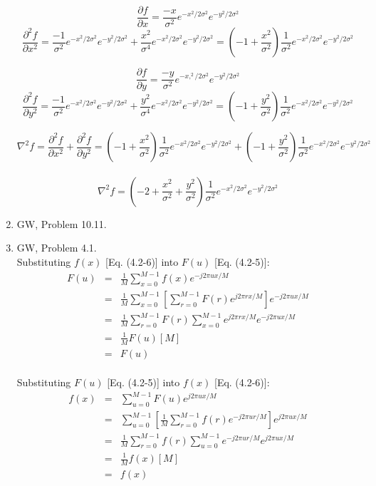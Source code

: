 \documentclass[10pt,letterpaper,oneside,onecolumn,leqno,fleqn]{article}
\begin{document}
\begin{enumerate}
      $$ \frac{\partial f}{\partial x} = \frac{-x}{\sigma^2}
      e^{-x^2/2\sigma^2}e^{-y^2/2\sigma^2} $$
      $$ \frac{\partial^2 f}{\partial x^2} = \frac{-1}{\sigma^2}
      e^{-x^2/2\sigma^2}e^{-y^2/2\sigma^2} + \frac{x^2}{\sigma^4} 
      e^{-x^2/2\sigma^2}e^{-y^2/2\sigma^2} =
      \left(-1 + \frac{x^2}{\sigma^2} \right)
      \frac{1}{\sigma^2}e^{-x^2/2\sigma^2}e^{-y^2/2\sigma^2} $$

      $$ \frac{\partial f}{\partial y} = \frac{-y}{\sigma^2}
      e^{-x,^2/2\sigma^2}e^{-y^2/2\sigma^2} $$
      $$ \frac{\partial^2 f}{\partial y^2} = \frac{-1}{\sigma^2}
      e^{-x^2/2\sigma^2}e^{-y^2/2\sigma^2} + \frac{y^2}{\sigma^4} 
      e^{-x^2/2\sigma^2}e^{-y^2/2\sigma^2}  =
      \left(-1 + \frac{y^2}{\sigma^2} \right)
      \frac{1}{\sigma^2}e^{-x^2/2\sigma^2}e^{-y^2/2\sigma^2} $$

      $$ \nabla^2f = \frac{\partial^2 f}{\partial x^2} +
      \frac{\partial^2 f}{\partial y^2} =
      \left(-1 + \frac{x^2}{\sigma^2} \right)
      \frac{1}{\sigma^2}e^{-x^2/2\sigma^2}e^{-y^2/2\sigma^2} +
      \left(-1 + \frac{y^2}{\sigma^2} \right)
      \frac{1}{\sigma^2}e^{-x^2/2\sigma^2}e^{-y^2/2\sigma^2} $$ \\
      $$ \nabla^2f =
      \left(-2 + \frac{x^2}{\sigma^2} + \frac{y^2}{\sigma^2} \right)
      \frac{1}{\sigma^2}e^{-x^2/2\sigma^2}e^{-y^2/2\sigma^2} $$

    \pagebreak
    \item
      GW, Problem 10.11.

    \pagebreak
    \item
      GW, Problem 4.1. \\
      \linebreak
      Substituting $ f(x) $ [Eq. (4.2-6)] into $ F(u) $ [Eq. (4.2-5)]:
      \begin{eqnarray*}
        F(u) &=& \frac{1}{M}\sum_{x=0}^{M-1} f(x)e^{-j2\pi ux/M} \\
             &=& \frac{1}{M}\sum_{x=0}^{M-1}\left[ \sum_{r=0}^{M-1} 
                 F(r) e^{j2\pi rx/M} \right] e^{-j2\pi ux/M} \\
             &=& \frac{1}{M}\sum_{r=0}^{M-1} F(r) \sum_{x=0}^{M-1} 
                 e^{j2\pi rx/M} e^{-j2\pi ux/M} \\
             &=& \frac{1}{M}F(u)[M] \\
             &=& F(u)
      \end{eqnarray*} \\
      \linebreak
      Substituting $ F(u) $ [Eq. (4.2-5)] into $ f(x) $ [Eq. (4.2-6)]:
      \begin{eqnarray*}
        f(x) &=& \sum_{u=0}^{M-1} F(u)e^{j2\pi ux/M} \\
             &=& \sum_{u=0}^{M-1} \left[ \frac{1}{M}\sum_{r=0}^{M-1}
                 f(r)e^{-j2\pi ur/M} \right] e^{j2\pi ux/M} \\
             &=& \frac{1}{M}\sum_{r=0}^{M-1} f(r) \sum_{u=0}^{M-1} 
                 e^{-j2\pi ur/M} e^{j2\pi ux/M} \\
             &=& \frac{1}{M}f(x)[M] \\
             &=& f(x)
      \end{eqnarray*}


\end{enumerate}
\end{document}
